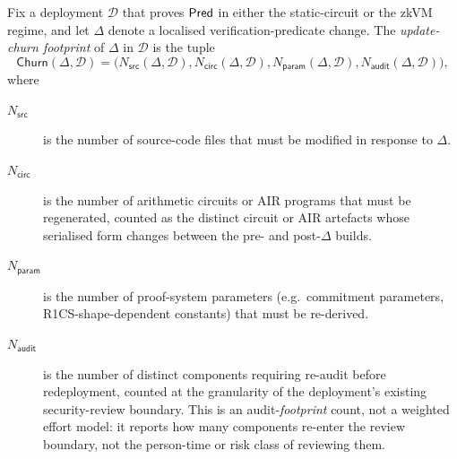\begin{definition}\label{def:update-churn}
Fix a deployment $\mathcal D$ that proves $\mathsf{Pred}$ in either the static-circuit or the zkVM regime, and let $\Delta$ denote a localised verification-predicate change. The \emph{update-churn footprint} of $\Delta$ in $\mathcal D$ is the tuple
\begin{equation*}
  \mathsf{Churn}(\Delta,\mathcal D)
  =
  \bigl(
    N_{\mathsf{src}}(\Delta,\mathcal D),
    N_{\mathsf{circ}}(\Delta,\mathcal D),
    N_{\mathsf{param}}(\Delta,\mathcal D),
    N_{\mathsf{audit}}(\Delta,\mathcal D)
  \bigr),
\end{equation*}
where
\begin{description}
  \item[$N_{\mathsf{src}}$] is the number of source-code files that must be modified in response to $\Delta$.
  \item[$N_{\mathsf{circ}}$] is the number of arithmetic circuits or AIR programs that must be regenerated, counted as the distinct circuit or AIR artefacts whose serialised form changes between the pre- and post-$\Delta$ builds.
  \item[$N_{\mathsf{param}}$] is the number of proof-system parameters (e.g.\ commitment parameters, R1CS-shape-dependent constants) that must be re-derived.
  \item[$N_{\mathsf{audit}}$] is the number of distinct components requiring re-audit before redeployment, counted at the granularity of the deployment's existing security-review boundary. This is an audit-\emph{footprint} count, not a weighted effort model: it reports how many components re-enter the review boundary, not the person-time or risk class of reviewing them.
\end{description}
\end{definition}

